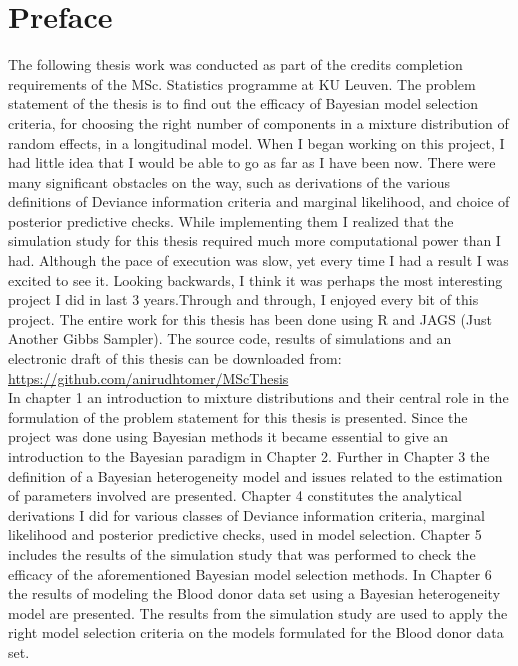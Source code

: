 
\chapter{Preface}
\label{ch : preface}

The following thesis work was conducted as part of the credits completion requirements of the MSc. Statistics programme at KU Leuven. The problem statement of the thesis is to find out the efficacy of Bayesian model selection criteria, for choosing the right number of components in a mixture distribution of random effects, in a longitudinal model. When I began working on this project, I had little idea that I would be able to go as far as I have been now. There were many significant obstacles on the way, such as derivations of the various definitions of Deviance information criteria and marginal likelihood, and choice of posterior predictive checks. While implementing them I realized that the simulation study for this thesis required much more computational power than I had. Although the pace of execution was slow, yet every time I had a result I was excited to see it. Looking backwards, I think it was perhaps the most interesting project I did in last 3 years.Through and through, I enjoyed every bit of this project. The entire work for this thesis has been done using R and JAGS (Just Another Gibbs Sampler). The source code, results of simulations and an electronic draft of this thesis can be downloaded from:\\
\url{https://github.com/anirudhtomer/MScThesis}\\

In chapter 1 an introduction to mixture distributions and their central role in the formulation of the problem statement for this thesis is presented. Since the project was done using Bayesian methods it became essential to give an introduction to the Bayesian paradigm in Chapter 2. Further in Chapter 3 the definition of a Bayesian heterogeneity model and issues related to the estimation of parameters involved are presented. Chapter 4 constitutes the analytical derivations I did for various classes of Deviance information criteria, marginal likelihood and posterior predictive checks, used in model selection. Chapter 5 includes the results of the simulation study that was performed to check the efficacy of the aforementioned Bayesian model selection methods. In Chapter 6 the results of modeling the Blood donor data set \citep{nasserinejad_prevalence_2015} using a Bayesian heterogeneity model are presented. The results from the simulation study are used to apply the right model selection criteria on the models formulated for the Blood donor data set.\\

